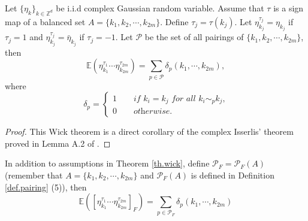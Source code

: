 \begin{thm}\label{th.wick}
Let $\{\eta_k\}_{k\in\mathbb{Z}^d}$ be i.i.d complex Gaussian random variable. Assume that $\tau$ is a sign map of a balanced set $A=\{k_1,k_2,\cdots,k_{2m}\}$. Define $\tau_{j}=\tau(k_j)$. Let $\eta_{k_j}^{\tau_j}=\eta_{k_j}$ if $\tau_j=1$ and $\eta_{k_j}^{\tau_j}=\bar{\eta}_{k_j}$ if $\tau_j=-1$. %
Let $\mathcal{P}$ be the set of all pairings of $\{k_1,k_2,\cdots,k_{2m}\}$, then
\begin{equation}
    \mathbb{E}(\eta^{\tau_1}_{k_1}\cdots \eta^{\tau_{2m}}_{k_{2m}})=\sum_{p\in \mathcal{P}}  \delta_{p}(k_1,\cdots,k_{2m}), 
\end{equation}
where 
\begin{equation}\label{eq.deltapairing}
\delta_{p}=\begin{cases}
1\qquad \textit{if $k_{i}=k_{j}$ for all $k_{i}\sim_{p}k_{j}$,}
\\
0\qquad \textit{otherwise.}
\end{cases}
\end{equation}
\end{thm}
\begin{proof}
This Wick theorem is a direct corollary of the complex Isserlis' theorem proved in Lemma A.2 of \cite{deng2021full}.
\end{proof}

\begin{thm}\label{th.wickr} In addition to assumptions in Theorem \ref{th.wick}, define $\mathcal{P}_F=\mathcal{P}_F(A)$ (remember that $A=\{k_1,k_2,\cdots,k_{2m}\}$ and $\mathcal{P}_F(A)$ is defined in Definition \ref{def.pairing} (5)), then 
\begin{equation}
    \mathbb{E}([\eta^{\tau_1}_{k_1}\cdots \eta^{\tau_{2m}}_{k_{2m}}]_F)=\sum_{p\in \mathcal{P}_F} \delta_{p}(k_1,\cdots,k_{2m})
\end{equation}
\end{thm}

